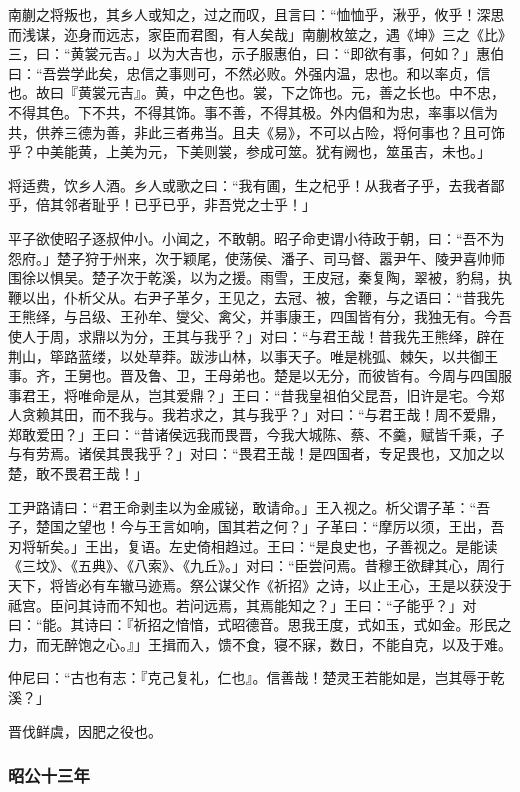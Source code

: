 \documentclass[]{article}
\begin{document}
南蒯之将叛也，其乡人或知之，过之而叹，且言曰：``恤恤乎，湫乎，攸乎！深思而浅谋，迩身而远志，家臣而君图，有人矣哉」南蒯枚筮之，遇《坤》三之《比》三，曰：``黄裳元吉。」以为大吉也，示子服惠伯，曰：``即欲有事，何如？」惠伯曰：``吾尝学此矣，忠信之事则可，不然必败。外强内温，忠也。和以率贞，信也。故曰『黄裳元吉』。黄，中之色也。裳，下之饰也。元，善之长也。中不忠，不得其色。下不共，不得其饰。事不善，不得其极。外内倡和为忠，率事以信为共，供养三德为善，非此三者弗当。且夫《易》，不可以占险，将何事也？且可饰乎？中美能黄，上美为元，下美则裳，参成可筮。犹有阙也，筮虽吉，未也。」

将适费，饮乡人酒。乡人或歌之曰：``我有圃，生之杞乎！从我者子乎，去我者鄙乎，倍其邻者耻乎！已乎已乎，非吾党之士乎！」

平子欲使昭子逐叔仲小。小闻之，不敢朝。昭子命吏谓小待政于朝，曰：``吾不为怨府。」楚子狩于州来，次于颖尾，使荡侯、潘子、司马督、嚣尹午、陵尹喜帅师围徐以惧吴。楚子次于乾溪，以为之援。雨雪，王皮冠，秦复陶，翠被，豹舄，执鞭以出，仆析父从。右尹子革夕，王见之，去冠、被，舍鞭，与之语曰：``昔我先王熊绎，与吕级、王孙牟、燮父、禽父，并事康王，四国皆有分，我独无有。今吾使人于周，求鼎以为分，王其与我乎？」对曰：``与君王哉！昔我先王熊绎，辟在荆山，筚路蓝缕，以处草莽。跋涉山林，以事天子。唯是桃弧、棘矢，以共御王事。齐，王舅也。晋及鲁、卫，王母弟也。楚是以无分，而彼皆有。今周与四国服事君王，将唯命是从，岂其爱鼎？」王曰：``昔我皇祖伯父昆吾，旧许是宅。今郑人贪赖其田，而不我与。我若求之，其与我乎？」对曰：``与君王哉！周不爱鼎，郑敢爱田？」王曰：``昔诸侯远我而畏晋，今我大城陈、蔡、不羹，赋皆千乘，子与有劳焉。诸侯其畏我乎？」对曰：``畏君王哉！是四国者，专足畏也，又加之以楚，敢不畏君王哉！」

工尹路请曰：``君王命剥圭以为金戚铋，敢请命。」王入视之。析父谓子革：``吾子，楚国之望也！今与王言如响，国其若之何？」子革曰：``摩厉以须，王出，吾刃将斩矣。」王出，复语。左史倚相趋过。王曰：``是良史也，子善视之。是能读《三坟》、《五典》、《八索》、《九丘》。」对曰：``臣尝问焉。昔穆王欲肆其心，周行天下，将皆必有车辙马迹焉。祭公谋父作《祈招》之诗，以止王心，王是以获没于祗宫。臣问其诗而不知也。若问远焉，其焉能知之？」王曰：``子能乎？」对曰：``能。其诗曰：『祈招之愔愔，式昭德音。思我王度，式如玉，式如金。形民之力，而无醉饱之心。』」王揖而入，馈不食，寝不寐，数日，不能自克，以及于难。

仲尼曰：``古也有志：『克己复礼，仁也』。信善哉！楚灵王若能如是，岂其辱于乾溪？」

晋伐鲜虞，因肥之役也。

\hypertarget{header-n2579}{%
\subsubsection{昭公十三年}\label{header-n2579}}
\end{document}

